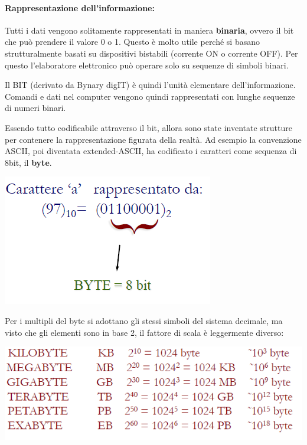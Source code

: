\documentclass[
  paper=a4,
  oneside  ,captions=tableheading
]{scrbook}
\begin{document}
\hypertarget{rappresentazione-dellinformazione}{%
\paragraph{Rappresentazione
dell'informazione:}\label{rappresentazione-dellinformazione}}

Tutti i dati vengono solitamente rappresentati in maniera
\textbf{binaria}, ovvero il bit che può prendere il valore 0 o 1. Questo
è molto utile perché si basano strutturalmente basati su dispositivi
bistabili (corrente ON o corrente OFF). Per questo l'elaboratore
elettronico può operare solo su sequenze di simboli binari.

Il BIT (derivato da Bynary digIT) è quindi l'unità elementare
dell'informazione. Comandi e dati nel computer vengono quindi
rappresentati con lunghe sequenze di numeri binari.

Essendo tutto codificabile attraverso il bit, allora sono state
inventate strutture per contenere la rappresentazione figurata della
realtà. Ad esempio la convenzione ASCII, poi diventata extended-ASCII,
ha codificato i caratteri come sequenza di 8bit, il \textbf{byte}.

\includegraphics{./image/image-20201111184647324.png}

Per i multipli del byte si adottano gli stessi simboli del sistema
decimale, ma visto che gli elementi sono in base 2, il fattore di scala
è leggermente diverso:

\includegraphics{./image/image-20201111184937248.png}
\end{document}
